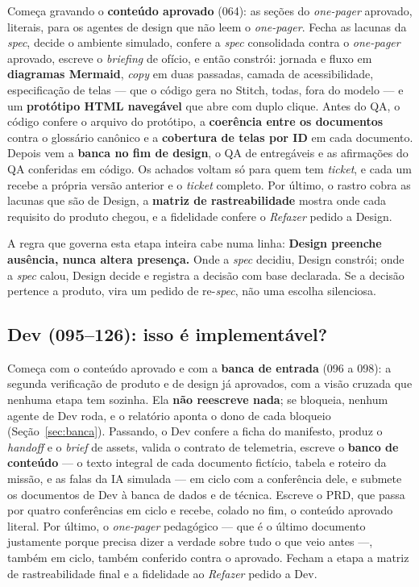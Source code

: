 \documentclass[11pt,a4paper]{article}
\begin{document}
Começa gravando o \textbf{conteúdo aprovado} (064): as seções do \emph{one-pager} aprovado, literais, para os agentes de design que não leem o \emph{one-pager}. Fecha as lacunas da \emph{spec}, decide o ambiente simulado, confere a \emph{spec} consolidada contra o \emph{one-pager} aprovado, escreve o \emph{briefing} de ofício, e então constrói: jornada e fluxo em \textbf{diagramas Mermaid}, \emph{copy} em duas passadas, camada de acessibilidade, especificação de telas --- que o código gera no Stitch, todas, fora do modelo --- e um \textbf{protótipo HTML navegável} que abre com duplo clique. Antes do QA, o código confere o arquivo do protótipo, a \textbf{coerência entre os documentos} contra o glossário canônico e a \textbf{cobertura de telas por ID} em cada documento. Depois vem a \textbf{banca no fim de design}, o QA de entregáveis e as afirmações do QA conferidas em código. Os achados voltam só para quem tem \emph{ticket}, e cada um recebe a própria versão anterior e o \emph{ticket} completo. Por último, o rastro cobra as lacunas que são de Design, a \textbf{matriz de rastreabilidade} mostra onde cada requisito do produto chegou, e a fidelidade confere o \emph{Refazer} pedido a Design.

A regra que governa esta etapa inteira cabe numa linha: \textbf{Design preenche ausência, nunca altera presença.} Onde a \emph{spec} decidiu, Design constrói; onde a \emph{spec} calou, Design decide e registra a decisão com base declarada. Se a decisão pertence a produto, vira um pedido de re-\emph{spec}, não uma escolha silenciosa.

\subsection{Dev (095--126): isso é implementável?}

Começa com o conteúdo aprovado e com a \textbf{banca de entrada} (096 a 098): a segunda verificação de produto e de design já aprovados, com a visão cruzada que nenhuma etapa tem sozinha. Ela \textbf{não reescreve nada}; se bloqueia, nenhum agente de Dev roda, e o relatório aponta o dono de cada bloqueio (Seção~\ref{sec:banca}). Passando, o Dev confere a ficha do manifesto, produz o \emph{handoff} e o \emph{brief} de assets, valida o contrato de telemetria, escreve o \textbf{banco de conteúdo} --- o texto integral de cada documento fictício, tabela e roteiro da missão, e as falas da IA simulada --- em ciclo com a conferência dele, e submete os documentos de Dev à banca de dados e de técnica. Escreve o PRD, que passa por quatro conferências em ciclo e recebe, colado no fim, o conteúdo aprovado literal. Por último, o \emph{one-pager} pedagógico --- que é o último documento justamente porque precisa dizer a verdade sobre tudo o que veio antes ---, também em ciclo, também conferido contra o aprovado. Fecham a etapa a matriz de rastreabilidade final e a fidelidade ao \emph{Refazer} pedido a Dev.
\end{document}

